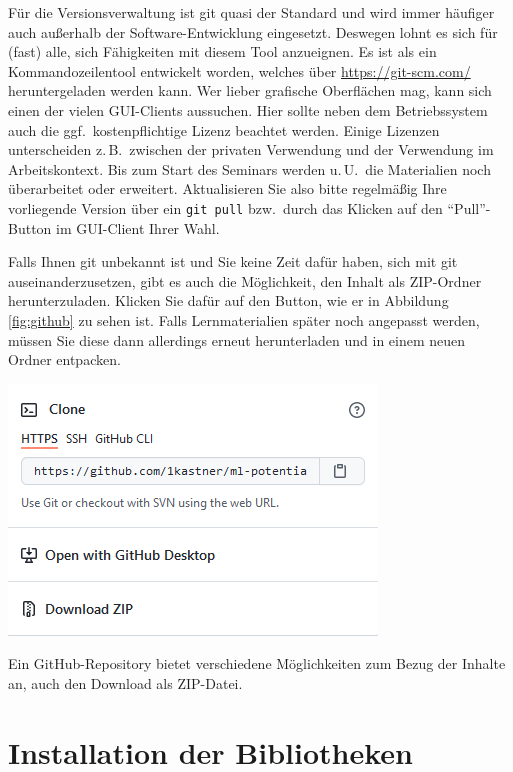 \documentclass{tufte-handout}
\begin{document}
Für die Versionsverwaltung ist git quasi der Standard und wird immer häufiger auch außerhalb der Software-Entwicklung eingesetzt.
Deswegen lohnt es sich für (fast) alle, sich Fähigkeiten mit diesem Tool anzueignen.
Es ist als ein Kommandozeilentool entwickelt worden, welches über
\url{https://git-scm.com/}
heruntergeladen werden kann.
Wer lieber grafische Oberflächen mag, kann sich einen der vielen GUI-Clients%
aussuchen.
Hier sollte neben dem Betriebssystem auch die ggf.\ kostenpflichtige Lizenz beachtet werden.
Einige Lizenzen unterscheiden z.\,B.\ zwischen der privaten Verwendung und der Verwendung im Arbeitskontext.
Bis zum Start des Seminars werden u.\,U.\ die Materialien noch überarbeitet oder erweitert.
Aktualisieren Sie also bitte regelmäßig Ihre vorliegende Version über ein \texttt{git pull} bzw.\ durch das Klicken auf den \enquote{Pull}-Button im GUI-Client Ihrer Wahl.

Falls Ihnen git unbekannt ist und Sie keine Zeit dafür haben, sich mit git auseinanderzusetzen, gibt es auch die Möglichkeit, den Inhalt als ZIP-Ordner herunterzuladen.
Klicken Sie dafür auf den Button, wie er in Abbildung\,\ref{fig:github} zu sehen ist.
Falls Lernmaterialien später noch angepasst werden, müssen Sie diese dann allerdings erneut herunterladen und in einem neuen Ordner entpacken.

\begin{marginfigure}
  \includegraphics{github-zip}
  \caption{Ein GitHub-Repository bietet verschiedene Möglichkeiten zum Bezug der Inhalte an, auch den Download als ZIP-Datei.}%
\label{fig:github}
\end{marginfigure}


\section{Installation der Bibliotheken}
\end{document}
